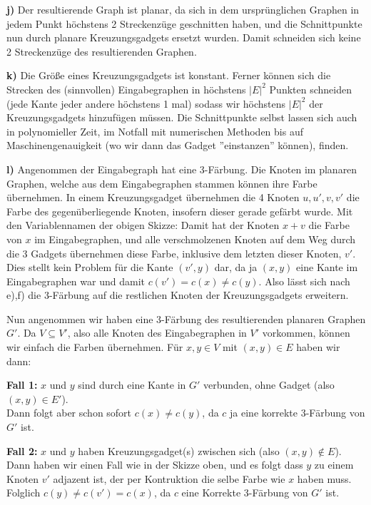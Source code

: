 \documentclass[a4paper,graphics,11pt]{article}
\begin{document}
\textbf{j)}
Der resultierende Graph ist planar, da sich in dem ursprünglichen Graphen in jedem Punkt höchstens 2 Streckenzüge
geschnitten haben, und die Schnittpunkte nun durch planare Kreuzungsgadgets ersetzt wurden. Damit schneiden sich
keine 2 Streckenzüge des resultierenden Graphen.

\textbf{k)}
Die Größe eines Kreuzungsgadgets ist konstant. Ferner können sich die Strecken des (sinnvollen) Eingabegraphen in höchstens $|E|^2$
Punkten schneiden (jede Kante jeder andere höchstens 1 mal) sodass wir höchstens $|E|^2$ der Kreuzungsgadgets
hinzufügen müssen. Die Schnittpunkte selbst lassen sich auch in polynomieller Zeit,
im Notfall mit numerischen Methoden bis auf Maschinengenauigkeit (wo wir dann das Gadget ''einstanzen'' können), finden.

\textbf{l)}
Angenommen der Eingabegraph hat eine 3-Färbung. Die Knoten im planaren Graphen, welche aus dem Eingabegraphen stammen
können ihre Farbe übernehmen. In einem Kreuzungsgadget übernehmen die 4 Knoten $u,u',v,v'$ die Farbe des gegenüberliegende Knoten,
insofern dieser gerade gefärbt wurde. Mit den Variablennamen der obigen Skizze: Damit hat der Knoten $x+v$ die Farbe von
$x$ im Eingabegraphen, und alle verschmolzenen Knoten auf dem Weg durch die 3 Gadgets übernehmen diese Farbe, inklusive
dem letzten dieser Knoten, $v'$. Dies stellt kein Problem für die Kante $(v',y)$ dar, da ja $(x,y)$ eine Kante im Eingabegraphen
war und damit $c(v') = c(x) \neq c(y)$. Also lässt sich nach e),f) die 3-Färbung auf die restlichen Knoten der Kreuzungsgadgets
erweitern.

Nun angenommen wir haben eine 3-Färbung des resultierenden planaren Graphen $G'$. Da $V \subseteq V'$, also alle Knoten
des Eingabegraphen in $V'$ vorkommen, können wir einfach die Farben übernehmen. Für $x,y \in V$ mit $(x,y) \in E$ haben wir dann:

\textbf{Fall 1:} $x$ und $y$ sind durch eine Kante in $G'$ verbunden, ohne Gadget (also $(x,y) \in E'$).\\
Dann folgt aber schon sofort $c(x) \neq c(y)$, da $c$ ja eine korrekte 3-Färbung von $G'$ ist.

\textbf{Fall 2:} $x$ und $y$ haben Kreuzungsgadget(s) zwischen sich (also $(x,y) \notin E$).\\
Dann haben wir einen Fall wie in der Skizze oben, und es folgt dass $y$ zu einem Knoten $v'$ adjazent ist,
der per Kontruktion die selbe Farbe wie $x$ haben muss. Folglich $c(y) \neq c(v') = c(x)$, da $c$ eine Korrekte
3-Färbung von $G'$ ist.
\end{document}
